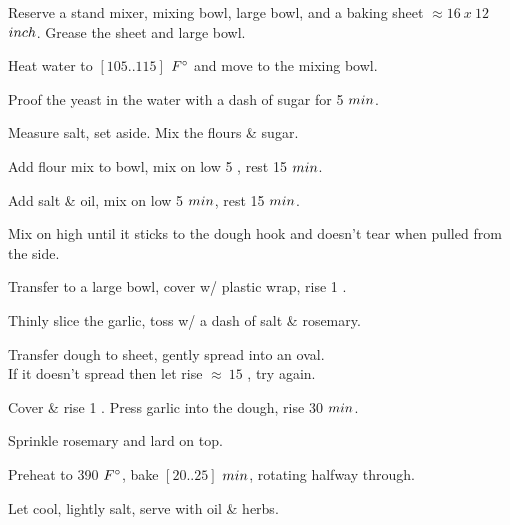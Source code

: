 \begin{preparation}
\item Reserve a stand mixer, mixing bowl, large bowl, and a baking sheet $\approx 16~x~12$ $\inch$.
    Grease the sheet and large bowl.
\item Heat water to $[105..115]$ $\Fahrenheit$ and move to the mixing bowl.
\item Proof the yeast in the water with a dash of sugar for 5 $\minute$.
\item Measure salt, set aside. Mix the flours \& sugar.
\item Add flour mix to bowl, mix on low 5 \minute, rest 15 $\minute$.
\item Add salt \& oil, mix on low 5 $\minute$, rest 15 $\minute$.
\item Mix on high until it sticks to the dough hook and doesn't tear when pulled from the side.
\item Transfer to a large bowl, cover w/ plastic wrap, rise 1 \hour.
\item Thinly slice the garlic, toss w/ a dash of salt \& rosemary.
\item Transfer dough to sheet, gently spread into an oval.\\
    If it doesn't spread then let rise $\approx~15$ \minute, try again.
\item Cover \& rise 1 \hour. Press garlic into the dough, rise 30 $\minute$.
\item Sprinkle rosemary and lard on top.
\item Preheat to 390 $\Fahrenheit$, bake $[20..25]$ $\minute$, rotating halfway through.
\item Let cool, lightly salt, serve with oil \& herbs.
\end{preparation}


\recipeend%
